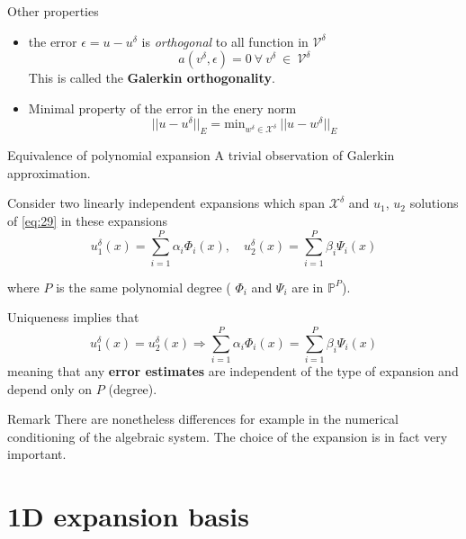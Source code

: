 \begin{frame}{Other properties}
  \begin{itemize}
  \item the error $\epsilon = u-u^\delta$ is \emph{orthogonal} to all function in $\mathcal{V}^\delta$
    \begin{equation}
      \label{eq:33}
      a(v^\delta, \epsilon) = 0\ \forall\ v^\delta\ \in\ \mathcal{V}^\delta
    \end{equation}
    This is called the \textbf{Galerkin orthogonality}.
  \item Minimal property of the error in the enery norm
    \begin{equation}
      \label{eq:34}
      ||u-u^\delta||_E = \mathrm{min}_{w^{\delta} \in \mathcal{X}^\delta}\ ||u-w^\delta||_E
    \end{equation}
  \end{itemize}
\end{frame}

\begin{frame}{Equivalence of polynomial expansion}
  A trivial observation of Galerkin approximation.

  Consider two linearly independent expansions which span
  $\mathcal{X}^\delta$ and $u_1$, $u_2$  solutions of \eqref{eq:29} in these
  expansions
  \begin{equation}
    \label{eq:36}
    u_1^\delta(x) = \sum_{i=1}^P \alpha_i \Phi_i(x), \quad u_2^\delta(x) = \sum_{i=1}^P \beta_i \Psi_i(x)
  \end{equation}

  where $P$ is the same polynomial degree ( $\Phi_i$ and $\Psi_i$ are in $\mathbb{P}^P$).

  Uniqueness implies that
  \begin{equation}
    \label{eq:37}
    u_1^\delta(x) = u_2^\delta(x) \Rightarrow \sum_{i=1}^P \alpha_i \Phi_i(x) = \sum_{i=1}^P \beta_i \Psi_i(x)
  \end{equation}
  meaning that any \textbf{error estimates} are independent of the type of expansion and depend only on $P$ (degree).

  \begin{alertblock}{Remark}
    There are nonetheless differences for example in the numerical
    conditioning of the algebraic system. The choice of the expansion
    is in fact very important.
  \end{alertblock}
\end{frame}

\section{1D expansion basis}
\label{sec:1d-expansion-basis}

